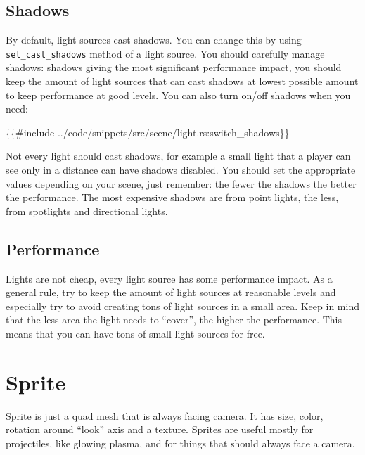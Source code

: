 \documentclass[
]{book}
\newenvironment{Shaded}{\begin{snugshade}}{\end{snugshade}}
\newcommand{\NormalTok}[1]{#1}
\theoremstyle{definition}
\theoremstyle{definition}
\theoremstyle{definition}
\theoremstyle{definition}
\theoremstyle{remark}
\begin{document}
\subsection{Shadows}\label{shadows}

By default, light sources cast shadows. You can change this by using \texttt{set\_cast\_shadows} method of a light source. You should carefully manage shadows: shadows giving the most significant performance impact, you should keep the amount of light sources that can cast shadows at lowest possible amount to keep performance at good levels. You can also turn on/off shadows when you need:

\begin{Shaded}
\begin{Highlighting}[]
\NormalTok{\{\{\#include ../code/snippets/src/scene/light.rs:switch\_shadows\}\}}
\end{Highlighting}
\end{Shaded}

Not every light should cast shadows, for example a small light that a player can see only in a distance can have shadows disabled. You should set the appropriate values depending on your scene, just remember: the fewer the shadows the better the performance. The most expensive shadows are from point lights, the less, from spotlights and directional lights.

\subsection{Performance}\label{performance-2}

Lights are not cheap, every light source has some performance impact. As a general rule, try to keep the amount of light sources at reasonable levels and especially try to avoid creating tons of light sources in a small area. Keep in mind that the less area the light needs to ``cover'', the higher the performance. This means that you can have tons of small light sources for free.

\section{Sprite}\label{sprite}

Sprite is just a quad mesh that is always facing camera. It has size, color, rotation around ``look'' axis and a texture. Sprites are useful mostly for projectiles, like glowing plasma, and for things that should always face a camera.
\end{document}

